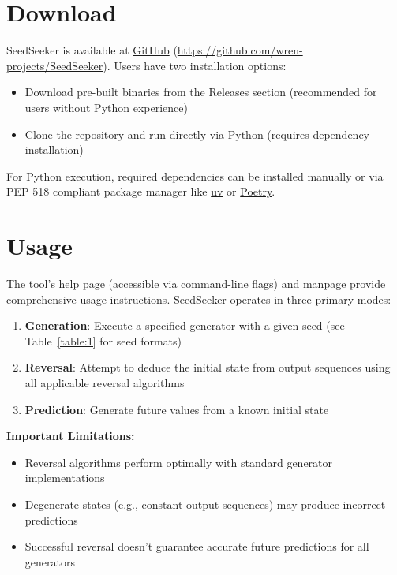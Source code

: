 \documentclass[12pt, a4paper]{report}
\begin{document}
\section{Download}
SeedSeeker is available at \href{https://github.com/wren-projects/SeedSeeker}{GitHub} 
(\url{https://github.com/wren-projects/SeedSeeker}). Users have two installation options:

\begin{itemize}
    \item Download pre-built binaries from the Releases section (recommended for users without Python experience)
    \item Clone the repository and run directly via Python (requires dependency installation)
\end{itemize}

For Python execution, required dependencies can be installed manually or via PEP 518 compliant package manager like 
\href{https://github.com/astral-sh/uv}{uv} or \href{https://python-poetry.org}{Poetry}.

\section{Usage}
The tool's help page (accessible via command-line flags) and manpage provide comprehensive usage instructions. 
SeedSeeker operates in three primary modes:

\begin{enumerate}
    \item \textbf{Generation}: Execute a specified generator with a given seed 
        (see Table~\ref{table:1} for seed formats)
    \item \textbf{Reversal}: Attempt to deduce the initial state 
        from output sequences using all applicable reversal algorithms
    \item \textbf{Prediction}: Generate future values from a known initial state
\end{enumerate}

\textbf{Important Limitations:}
\begin{itemize}
    \item Reversal algorithms perform optimally with standard generator implementations
    \item Degenerate states (e.g., constant output sequences) may produce incorrect predictions
    \item Successful reversal doesn't guarantee accurate future predictions for all generators
\end{itemize}
\end{document}
